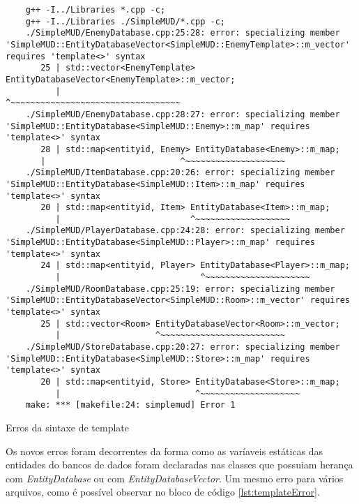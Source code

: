 \begin{listing}[!ht]
    \begin{verbatim}
    g++ -I../Libraries *.cpp -c;
    g++ -I../Libraries ./SimpleMUD/*.cpp -c;
    ./SimpleMUD/EnemyDatabase.cpp:25:28: error: specializing member 'SimpleMUD::EntityDatabaseVector<SimpleMUD::EnemyTemplate>::m_vector' requires 'template<>' syntax
       25 | std::vector<EnemyTemplate> EntityDatabaseVector<EnemyTemplate>::m_vector;
          |                            ^~~~~~~~~~~~~~~~~~~~~~~~~~~~~~~~~~~
    ./SimpleMUD/EnemyDatabase.cpp:28:27: error: specializing member 'SimpleMUD::EntityDatabase<SimpleMUD::Enemy>::m_map' requires 'template<>' syntax
       28 | std::map<entityid, Enemy> EntityDatabase<Enemy>::m_map;
       |                           ^~~~~~~~~~~~~~~~~~~~~
    ./SimpleMUD/ItemDatabase.cpp:20:26: error: specializing member 'SimpleMUD::EntityDatabase<SimpleMUD::Item>::m_map' requires 'template<>' syntax
       20 | std::map<entityid, Item> EntityDatabase<Item>::m_map;
          |                          ^~~~~~~~~~~~~~~~~~~~
    ./SimpleMUD/PlayerDatabase.cpp:24:28: error: specializing member 'SimpleMUD::EntityDatabase<SimpleMUD::Player>::m_map' requires 'template<>' syntax
       24 | std::map<entityid, Player> EntityDatabase<Player>::m_map;
          |                            ^~~~~~~~~~~~~~~~~~~~~~
    ./SimpleMUD/RoomDatabase.cpp:25:19: error: specializing member 'SimpleMUD::EntityDatabaseVector<SimpleMUD::Room>::m_vector' requires 'template<>' syntax
       25 | std::vector<Room> EntityDatabaseVector<Room>::m_vector;
          |                   ^~~~~~~~~~~~~~~~~~~~~~~~~~
    ./SimpleMUD/StoreDatabase.cpp:20:27: error: specializing member 'SimpleMUD::EntityDatabase<SimpleMUD::Store>::m_map' requires 'template<>' syntax
       20 | std::map<entityid, Store> EntityDatabase<Store>::m_map;
          |                           ^~~~~~~~~~~~~~~~~~~~~
    make: *** [makefile:24: simplemud] Error 1
    \end{verbatim}
\caption{Erros da sintaxe de template}
\label{lst:templateError}
\end{listing}

Os novos erros foram decorrentes da forma como as varíaveis estáticas das entidades do bancos de dados
foram declaradas nas classes que possuiam herança com \textit{EntityDatabase} ou com \textit{EntityDatabaseVector}. 
Um mesmo erro para vários arquivos, como é possível observar no bloco de código \ref{lst:templateError}. 

